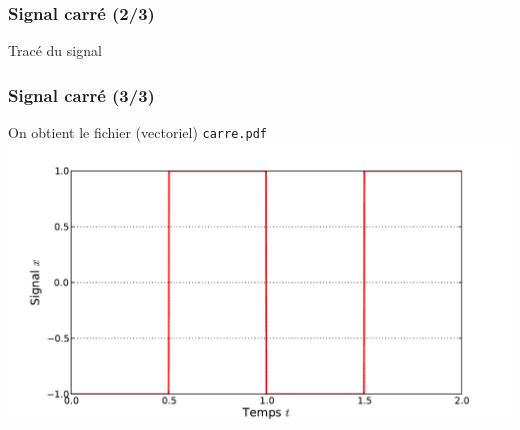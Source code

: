 \documentclass[8pt,a4paper]{beamer}
\begin{document}
  \begin{frame}[containsverbatim]
  \frametitle{Signal carré (2/3)}  
  \begin{block}{Tracé du signal} 
  
  \end{block}
  \end{frame}
  \begin{frame}[containsverbatim]
  \frametitle{Signal carré (3/3)}
  On obtient le fichier (vectoriel) \lstinline!carre.pdf!\\  
  \includegraphics[width=1.\textwidth]{figures/carre.pdf}
  \end{frame}
  
\end{document}
